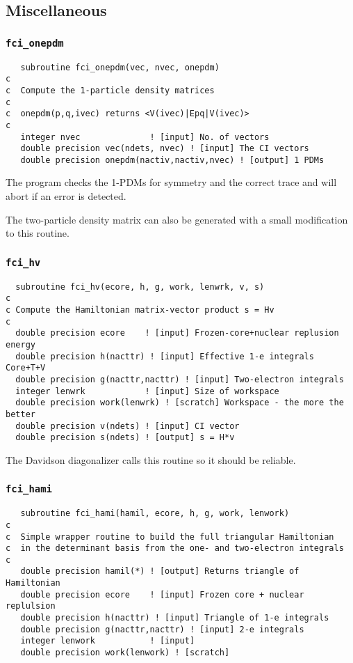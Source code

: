 \documentclass[fullpage,12pt,fleqn]{article}
\begin{document}
\subsection{Miscellaneous}

\subsubsection{{\tt fci\_onepdm}}
\begin{verbatim}
   subroutine fci_onepdm(vec, nvec, onepdm)
c  
c  Compute the 1-particle density matrices
c  
c  onepdm(p,q,ivec) returns <V(ivec)|Epq|V(ivec)>
c  
   integer nvec              ! [input] No. of vectors
   double precision vec(ndets, nvec) ! [input] The CI vectors
   double precision onepdm(nactiv,nactiv,nvec) ! [output] 1 PDMs
\end{verbatim}

The program checks the 1-PDMs for symmetry and the correct trace and
will abort if an error is detected.

The two-particle density matrix can also be generated with a small
modification to this routine.

\subsubsection{{\tt fci\_hv}}
\begin{verbatim}
  subroutine fci_hv(ecore, h, g, work, lenwrk, v, s)
c
c Compute the Hamiltonian matrix-vector product s = Hv 
c
  double precision ecore    ! [input] Frozen-core+nuclear replusion energy
  double precision h(nacttr) ! [input] Effective 1-e integrals Core+T+V
  double precision g(nacttr,nacttr) ! [input] Two-electron integrals
  integer lenwrk            ! [input] Size of workspace
  double precision work(lenwrk) ! [scratch] Workspace - the more the better
  double precision v(ndets) ! [input] CI vector
  double precision s(ndets) ! [output] s = H*v
\end{verbatim}

The Davidson diagonalizer calls this routine so it should be reliable.

\subsubsection{{\tt fci\_hami}}
\begin{verbatim}
   subroutine fci_hami(hamil, ecore, h, g, work, lenwork)
c
c  Simple wrapper routine to build the full triangular Hamiltonian
c  in the determinant basis from the one- and two-electron integrals
c
   double precision hamil(*) ! [output] Returns triangle of Hamiltonian
   double precision ecore    ! [input] Frozen core + nuclear replulsion
   double precision h(nacttr) ! [input] Triangle of 1-e integrals
   double precision g(nacttr,nacttr) ! [input] 2-e integrals
   integer lenwork           ! [input]
   double precision work(lenwork) ! [scratch]
\end{verbatim}
\end{document}
